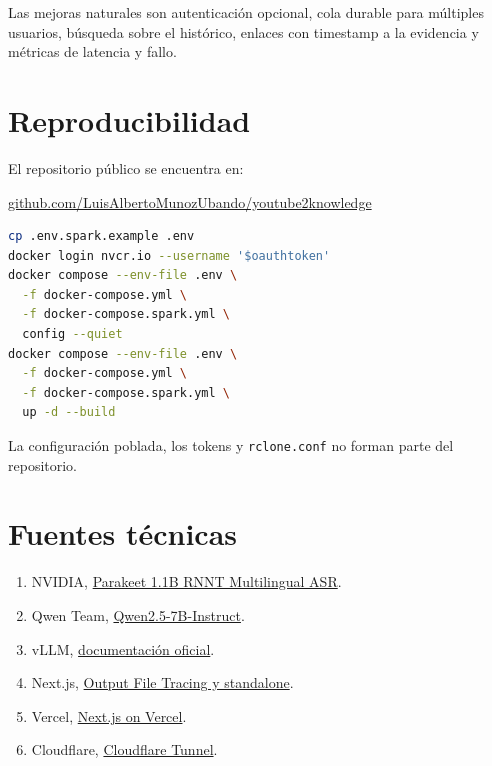 \documentclass[11pt,a4paper]{article}
\begin{document}
Las mejoras naturales son autenticación opcional, cola durable para múltiples
usuarios, búsqueda sobre el histórico, enlaces con timestamp a la evidencia y
métricas de latencia y fallo.

\section{Reproducibilidad}
El repositorio público se encuentra en:
\begin{center}
  \href{https://github.com/LuisAlbertoMunozUbando/youtube2knowledge}
  {github.com/LuisAlbertoMunozUbando/youtube2knowledge}
\end{center}

\begin{lstlisting}[language=bash]
cp .env.spark.example .env
docker login nvcr.io --username '$oauthtoken'
docker compose --env-file .env \
  -f docker-compose.yml \
  -f docker-compose.spark.yml \
  config --quiet
docker compose --env-file .env \
  -f docker-compose.yml \
  -f docker-compose.spark.yml \
  up -d --build
\end{lstlisting}

La configuración poblada, los tokens y \texttt{rclone.conf} no forman parte del
repositorio.

\section{Fuentes técnicas}
\begin{enumerate}
  \item NVIDIA,
    \href{https://build.nvidia.com/nvidia/parakeet-1_1b-rnnt-multilingual-asr/modelcard}
    {Parakeet 1.1B RNNT Multilingual ASR}.
  \item Qwen Team,
    \href{https://huggingface.co/Qwen/Qwen2.5-7B-Instruct}
    {Qwen2.5-7B-Instruct}.
  \item vLLM, \href{https://docs.vllm.ai/}{documentación oficial}.
  \item Next.js,
    \href{https://nextjs.org/docs/app/api-reference/config/next-config-js/output}
    {Output File Tracing y standalone}.
  \item Vercel,
    \href{https://vercel.com/docs/frameworks/full-stack/nextjs}
    {Next.js on Vercel}.
  \item Cloudflare,
    \href{https://developers.cloudflare.com/cloudflare-one/connections/connect-networks/}
    {Cloudflare Tunnel}.
\end{enumerate}


\end{document}
